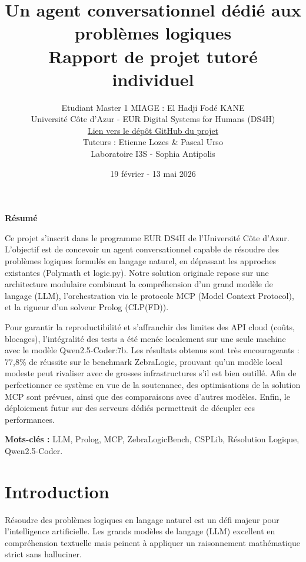 \documentclass[12pt,a4paper]{article}
\title{\textbf{Un agent conversationnel dédié aux problèmes logiques}\\
\large Rapport de projet tutoré individuel}
\author{Etudiant Master 1 MIAGE : El Hadji Fodé KANE\\
Université Côte d'Azur - EUR Digital Systems for Humans (DS4H)\\
\href{https://github.com/VOTRE_COMPTE/VOTRE_REPO}{Lien vers le dépôt GitHub du projet}\\
\smallskip
\small Tuteurs : Etienne Lozes \& Pascal Urso\\
\small Laboratoire I3S - Sophia Antipolis}
\date{19 février - 13 mai 2026}
\begin{document}
\maketitle
\newpage

\begin{center}
\Large\textbf{Résumé}
\end{center}
\vspace{0.5cm}

Ce projet s'inscrit dans le programme EUR DS4H de l'Université Côte d'Azur. L'objectif est de concevoir un agent conversationnel capable de résoudre des problèmes logiques formulés en langage naturel, en dépassant les approches existantes (Polymath et logic.py). Notre solution originale repose sur une architecture modulaire combinant la compréhension d'un grand modèle de langage (LLM), l'orchestration via le protocole MCP (Model Context Protocol), et la rigueur d'un solveur Prolog (CLP(FD)). 

Pour garantir la reproductibilité et s'affranchir des limites des API cloud (coûts, blocages), l'intégralité des tests a été menée localement sur une seule machine avec le modèle Qwen2.5-Coder:7b. Les résultats obtenus sont très encourageants : 77,8\% de réussite sur le benchmark ZebraLogic, prouvant qu'un modèle local modeste peut rivaliser avec de grosses infrastructures s'il est bien outillé. Afin de perfectionner ce système en vue de la soutenance, des optimisations de la solution MCP sont prévues, ainsi que des comparaisons avec d'autres modèles. Enfin, le déploiement futur sur des serveurs dédiés permettrait de décupler ces performances.

\vspace{0.5cm}
\textbf{Mots-clés :} LLM, Prolog, MCP, ZebraLogicBench, CSPLib, Résolution Logique, Qwen2.5-Coder.

\newpage
\tableofcontents
\newpage

\section{Introduction}

Résoudre des problèmes logiques en langage naturel est un défi majeur pour l'intelligence artificielle. Les grands modèles de langage (LLM) excellent en compréhension textuelle mais peinent à appliquer un raisonnement mathématique strict sans halluciner. 
\end{document}
